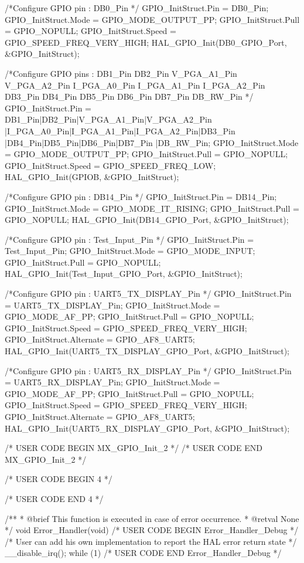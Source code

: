 {  /*Configure GPIO pin : DB0_Pin */
  GPIO_InitStruct.Pin = DB0_Pin;
  GPIO_InitStruct.Mode = GPIO_MODE_OUTPUT_PP;
  GPIO_InitStruct.Pull = GPIO_NOPULL;
  GPIO_InitStruct.Speed = GPIO_SPEED_FREQ_VERY_HIGH;
  HAL_GPIO_Init(DB0_GPIO_Port, &GPIO_InitStruct);

  /*Configure GPIO pins : DB1_Pin DB2_Pin V_PGA_A1_Pin V_PGA_A2_Pin
                           I_PGA_A0_Pin I_PGA_A1_Pin I_PGA_A2_Pin DB3_Pin
                           DB4_Pin DB5_Pin DB6_Pin DB7_Pin
                           DB_RW_Pin */
  GPIO_InitStruct.Pin = DB1_Pin|DB2_Pin|V_PGA_A1_Pin|V_PGA_A2_Pin
                          |I_PGA_A0_Pin|I_PGA_A1_Pin|I_PGA_A2_Pin|DB3_Pin
                          |DB4_Pin|DB5_Pin|DB6_Pin|DB7_Pin
                          |DB_RW_Pin;
  GPIO_InitStruct.Mode = GPIO_MODE_OUTPUT_PP;
  GPIO_InitStruct.Pull = GPIO_NOPULL;
  GPIO_InitStruct.Speed = GPIO_SPEED_FREQ_LOW;
  HAL_GPIO_Init(GPIOB, &GPIO_InitStruct);

  /*Configure GPIO pin : DB14_Pin */
  GPIO_InitStruct.Pin = DB14_Pin;
  GPIO_InitStruct.Mode = GPIO_MODE_IT_RISING;
  GPIO_InitStruct.Pull = GPIO_NOPULL;
  HAL_GPIO_Init(DB14_GPIO_Port, &GPIO_InitStruct);

  /*Configure GPIO pin : Test_Input_Pin */
  GPIO_InitStruct.Pin = Test_Input_Pin;
  GPIO_InitStruct.Mode = GPIO_MODE_INPUT;
  GPIO_InitStruct.Pull = GPIO_NOPULL;
  HAL_GPIO_Init(Test_Input_GPIO_Port, &GPIO_InitStruct);

  /*Configure GPIO pin : UART5_TX_DISPLAY_Pin */
  GPIO_InitStruct.Pin = UART5_TX_DISPLAY_Pin;
  GPIO_InitStruct.Mode = GPIO_MODE_AF_PP;
  GPIO_InitStruct.Pull = GPIO_NOPULL;
  GPIO_InitStruct.Speed = GPIO_SPEED_FREQ_VERY_HIGH;
  GPIO_InitStruct.Alternate = GPIO_AF8_UART5;
  HAL_GPIO_Init(UART5_TX_DISPLAY_GPIO_Port, &GPIO_InitStruct);

  /*Configure GPIO pin : UART5_RX_DISPLAY_Pin */
  GPIO_InitStruct.Pin = UART5_RX_DISPLAY_Pin;
  GPIO_InitStruct.Mode = GPIO_MODE_AF_PP;
  GPIO_InitStruct.Pull = GPIO_NOPULL;
  GPIO_InitStruct.Speed = GPIO_SPEED_FREQ_VERY_HIGH;
  GPIO_InitStruct.Alternate = GPIO_AF8_UART5;
  HAL_GPIO_Init(UART5_RX_DISPLAY_GPIO_Port, &GPIO_InitStruct);

/* USER CODE BEGIN MX_GPIO_Init_2 */
/* USER CODE END MX_GPIO_Init_2 */
}

/* USER CODE BEGIN 4 */

/* USER CODE END 4 */

/**
  * @brief  This function is executed in case of error occurrence.
  * @retval None
  */
void Error_Handler(void)
{
  /* USER CODE BEGIN Error_Handler_Debug */
  /* User can add his own implementation to report the HAL error return state */
  __disable_irq();
  while (1)
  {
  }
  /* USER CODE END Error_Handler_Debug */
}

